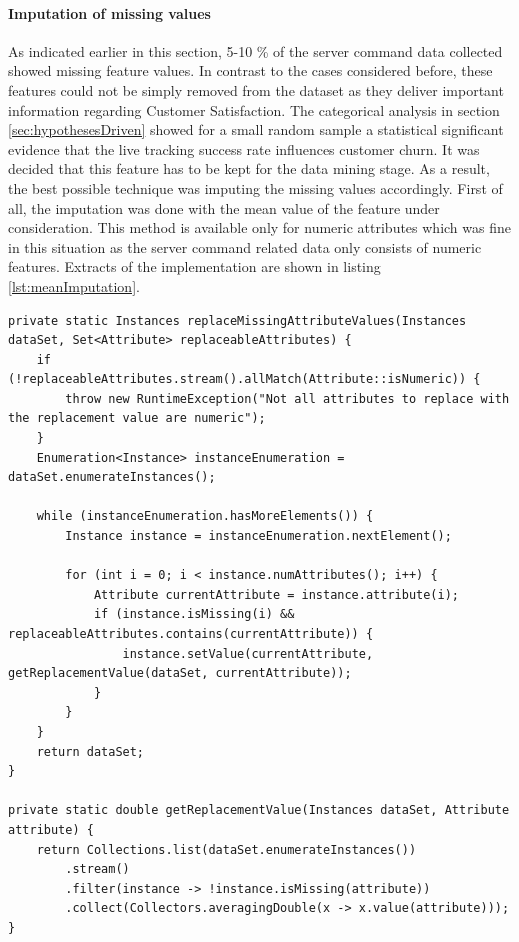 \paragraph{Imputation of missing values}
As indicated earlier in this section, 5-10 \% of the server command data collected showed missing feature values. In contrast to the cases considered before, these features could not be simply removed from the dataset as they deliver important information regarding Customer Satisfaction. The categorical analysis in section \ref{sec:hypothesesDriven} showed for a small random sample a statistical significant evidence that the live tracking success rate influences customer churn. It was decided that this feature has to be kept for the data mining stage. As a result, the best possible technique was imputing the missing values accordingly. First of all, the imputation was done with the mean value of the feature under consideration. This method is available only for numeric attributes which was fine in this situation as the server command related data only consists of numeric features. Extracts of the implementation are shown in listing \ref{lst:meanImputation}.

\begin{lstlisting}[caption={Mean and mode imputation of missing values}, label={lst:meanImputation}]
private static Instances replaceMissingAttributeValues(Instances dataSet, Set<Attribute> replaceableAttributes) {
	if (!replaceableAttributes.stream().allMatch(Attribute::isNumeric)) {
		throw new RuntimeException("Not all attributes to replace with the replacement value are numeric");
	}
	Enumeration<Instance> instanceEnumeration = dataSet.enumerateInstances();
	
	while (instanceEnumeration.hasMoreElements()) {
		Instance instance = instanceEnumeration.nextElement();
		
		for (int i = 0; i < instance.numAttributes(); i++) {
			Attribute currentAttribute = instance.attribute(i);
			if (instance.isMissing(i) && replaceableAttributes.contains(currentAttribute)) {
				instance.setValue(currentAttribute, getReplacementValue(dataSet, currentAttribute));
			}
		}
	}
	return dataSet;
}

private static double getReplacementValue(Instances dataSet, Attribute attribute) {
	return Collections.list(dataSet.enumerateInstances())
		.stream()
		.filter(instance -> !instance.isMissing(attribute))
		.collect(Collectors.averagingDouble(x -> x.value(attribute)));
}
\end{lstlisting}


